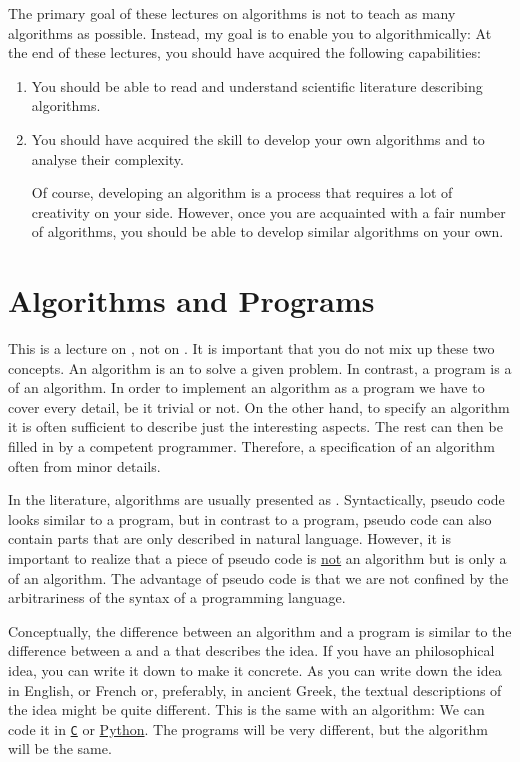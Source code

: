 The primary goal of these lectures on algorithms is not to teach as many algorithms as possible.
Instead, my goal is to enable you to  algorithmically:  At the end of these
lectures, you should have acquired the following capabilities:
\begin{enumerate}
\item You should be able to read and understand scientific literature describing algorithms.
\item You should have acquired the skill to develop your own algorithms and to analyse their complexity.

      Of course, developing an algorithm is a process that requires a lot of creativity on your side.  However,
      once you are acquainted with a fair number of algorithms, you should be able to develop similar
      algorithms on your own. 
\end{enumerate}


\section{Algorithms and Programs}
This is a lecture on , not on .  It is important that you do not mix up
these two concepts.  An algorithm  is an  to solve a given problem.  In
contrast, a program is a  of an algorithm.  In order to implement an
algorithm as a program we have to cover every detail, be it trivial or not.  On the other hand, 
to specify an algorithm it is often sufficient to describe just the interesting aspects.  The rest can then be
filled in by a competent programmer.  Therefore, a specification of an algorithm often  from minor
details. 

In the literature, algorithms are usually presented as . 
Syntactically, pseudo code looks
similar to a program, but in contrast to a program, pseudo code can also contain parts that are only
described in natural language.   However, it is important to realize that a piece of pseudo code is
\underline{not} an algorithm but is only a  of an algorithm.  The
advantage of pseudo code is that we are not confined by the arbitrariness of the syntax of a
programming language.

Conceptually, the difference between an algorithm and a program is similar to the difference between
a  and a  that describes the idea.  If you have an philosophical idea, you
can write it down to make it concrete.  As you can write down the idea in English, or French or, preferably, in
ancient Greek, the textual descriptions of the idea might be quite different.  This is the same with an algorithm:
We can code it in \href{https://en.wikipedia.org/wiki/C_(programming_language)}{\texttt{C}} or
\href{http://python.org}{Python}.  The programs will be very different, but the algorithm will be the same. 

